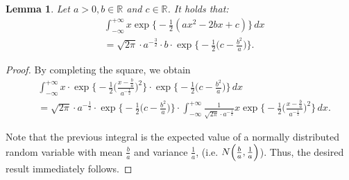 \documentclass{amsart}
\theoremstyle{plain}%
\newtheorem{lemma}[theorem]{Lemma}
\begin{document}
\begin{lemma} \label{lemma_2}
Let $a > 0, b \in \mathbb{R}$ and $c \in \mathbb{R}$. It holds  that:
\begin{align}
	& \int_{-\infty}^{+\infty} x \exp \Biggl\{-\frac{1}{2}(ax^2 -2bx + c)\Biggr\} \,dx  \\
	& = \sqrt{2\pi} \cdot a^{-\frac{3}{2}}\cdot b \cdot \exp \Biggl \{ -\frac{1}{2}\Biggl(c - \frac{b^2}{a} \Biggr) \Biggr \}.
\end{align}
\end{lemma}

\begin{proof}
By completing the square, we obtain 
\begin{align}
	& \int_{-\infty}^{+\infty} x \cdot \exp \Biggl\{-\frac{1}{2}\Biggl(\frac{x - \frac{b}{a}} {a^{-\frac{1}{2}}}\Biggr) ^2 \Biggr\}
	\cdot \exp \Biggl\{-\frac{1}{2} \Biggl(c - \frac{b^2}{a} \Biggr) \Biggr \}  \,dx \\ 
	& = \sqrt{2 \pi} \cdot a^{-\frac{1}{2}} \cdot \exp \Biggl\{-\frac{1}{2} \Biggl(c - \frac{b^2}{a} \Biggr)\Biggr\} \cdot 
	\int_{-\infty}^{+\infty} \frac{1}{\sqrt{2 \pi} \cdot a^{-\frac{1}{2}}}
		x \exp \Biggl\{-\frac{1}{2} \Biggl(\frac{x - \frac{b}{a}} {a^{-\frac{1}{2}}}\Biggr) ^2 \Biggr\} \,dx.
\end{align}

Note that the previous integral is the expected value of a normally distributed random variable with 
mean $\frac{b}{a}$ and variance $\frac{1}{a}$, (i.e. $N \Bigl (\frac{b}{a}, \frac{1}{a}\Bigr)$). 
Thus, the desired result immediately follows.
\end{proof}
\end{document}
